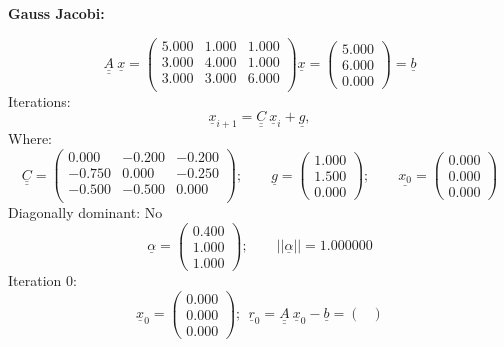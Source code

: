\documentclass{report}[10pts]
\begin{document}
\begin{small}
\begin{center}\textbf{Gauss Jacobi:}\end{center}
\[
   \underline{\underline{A}}~\underline{x}=
      \begin{pmatrix}
         5.000 & 1.000 & 1.000\\
         3.000 & 4.000 & 1.000\\
         3.000 & 3.000 & 6.000\\
      \end{pmatrix}
      \underline{x}=
      \begin{pmatrix}
      5.000 \\ 6.000 \\ 0.000
      \end{pmatrix}
   =\underline{b}
\]
Iterations:
\[
   \underline{x}_{i+1}=\underline{\underline{C}}~\underline{x}_i+\underline{g},
\]
Where:
\[
      \underline{\underline{C}}=
      \begin{pmatrix}
         0.000 & -0.200 & -0.200\\
         -0.750 & 0.000 & -0.250\\
         -0.500 & -0.500 & 0.000\\
      \end{pmatrix}
      ;\qquad
      \underline{g}=
      \begin{pmatrix}
      1.000 \\ 1.500 \\ 0.000
      \end{pmatrix}
      ;\qquad
      \underline{x_0}=
      \begin{pmatrix}
      0.000 \\ 0.000 \\ 0.000
      \end{pmatrix}
\]
Diagonally dominant: No
\[
      \underline{\alpha}=
      \begin{pmatrix}
      0.400 \\ 1.000 \\ 1.000
      \end{pmatrix}
      ;\qquad
   ||\underline{\alpha}||=1.000000
\]
Iteration 0:
\[
\underline{x}_{0}=
   \begin{pmatrix}
   0.000 \\ 0.000 \\ 0.000
   \end{pmatrix}
;~~
\underline{r}_{0}=
\underline{\underline{A}}~\underline{x}_{0}-
\underline{b}=
   \begin{pmatrix}

\end{pmatrix}\]
\end{small}
\end{document}
